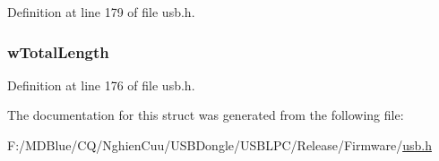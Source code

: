 Definition at line 179 of file usb.h.

\hypertarget{struct___u_s_b___c_o_n_f_i_g_u_r_a_t_i_o_n___d_e_s_c_r_i_p_t_o_r_a7b85867f4bc8a9a8a39791d85ae89fc8}{
\subsubsection[{wTotalLength}]{ {\bf wTotalLength}}}
\label{struct___u_s_b___c_o_n_f_i_g_u_r_a_t_i_o_n___d_e_s_c_r_i_p_t_o_r_a7b85867f4bc8a9a8a39791d85ae89fc8}


Definition at line 176 of file usb.h.



The documentation for this struct was generated from the following file:\begin{DoxyCompactItemize}
\item 
F:/MDBlue/CQ/NghienCuu/USBDongle/USBLPC/Release/Firmware/\hyperlink{usb_8h}{usb.h}\end{DoxyCompactItemize}
